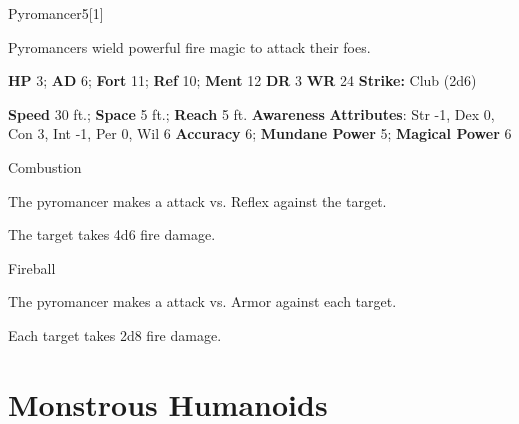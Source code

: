   \begin{monsection}{Pyromancer}{5}[1]
    \vspace{-1em}\vspace{-1em}
    \vspace{0em}

    
      Pyromancers wield powerful fire magic to attack their foes.
    

    \begin{spellcontent}
      \begin{spelltargetinginfo}
        \pari \textbf{HP} 3;
          \textbf{AD} 6;
          \textbf{Fort} 11;
          \textbf{Ref} 10;
          \textbf{Ment} 12
        \pari \textbf{DR} 3
        \pari \textbf{WR} 24
        \pari \textbf{Strike:}
            Club  (2d6)
      \end{spelltargetinginfo}
    \end{spellcontent}
    \begin{monsterfooter}
      \pari \textbf{Speed} 30 ft.;
        \textbf{Space} 5 ft.;
        \textbf{Reach} 5 ft.
      \pari \textbf{Awareness} 
      \pari \textbf{Attributes}:
        Str -1, Dex 0,
        Con 3, Int -1,
        Per 0, Wil 6
      \pari \textbf{Accuracy} 6;
        \textbf{Mundane Power} 5;
      \textbf{Magical Power} 6
    \end{monsterfooter}
  \end{monsection}
  \begin{freeability}{Combustion}
      
      The pyromancer makes a  attack
        vs. Reflex against the target.
    
    \hit The target takes 4d6 fire damage.
    \end{freeability}
  

    \begin{freeability}{Fireball}
      
      The pyromancer makes a  attack
        vs. Armor against each target.
    
    \hit Each target takes 2d8 fire damage.
    \end{freeability}
  
        \section{Monstrous Humanoids}
      
